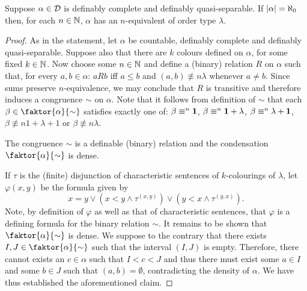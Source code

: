 	\begin{thm}
		Suppose $\alpha\in\mathcal{D}$ is definably complete and definably quasi-separable. If $\left\lvert\alpha\right\rvert=\aleph_0$ then, for each $n\in\mathbb{N}$, $\alpha$ has an $n$-equivalent of order type $\lambda$.
	\end{thm}
	\begin{proof}

		As in the statement, let $\alpha$ be countable, definably complete and definably quasi-separable.  Suppose also that there are $k$ colours defined on $\alpha$, for some fixed $k\in\mathbb{N}$.  Now choose some $n\in\mathbb{N}$ and define a (binary) relation $R$ on $\alpha$ such that, for every $a,b\in\alpha$:  $aRb$ iff $a\leq b$ and $(a,b)\nequiv{n}\lambda$ whenever $a\neq b$.  Since sums preserve $n$-equivalence, we may conclude that $R$ is transitive and therefore induces a congruence $\sim$ on $\alpha$.  Note that it follows from definition of $\sim$ that each $\beta\in\faktor{\alpha}{\sim}$ satisfies exactly one of: $\beta\equiv^{n}\mathbf{1}$, $\beta\equiv^{n}\mathbf{1}+\lambda$, $\beta\equiv^{n}\lambda+\mathbf{1}$, $\beta\nequiv{n}1+\lambda+1$ or $\beta\nequiv{n}\lambda$.

		\begin{claim}
			The congruence $\sim$ is a definable (binary) relation and the condensation $\faktor{\alpha}{\sim}$ is dense.
		\end{claim}
		If $\tau$ is the (finite) disjunction of characteristic sentences of $k$-colourings of $\lambda$, let $\varphi(x,y)$ be the formula given by
		\begin{equation}\label{eq:condef}
			x=y\vee(x<y\wedge\tau^{(x,y)})\vee(y<x\wedge\tau^{(y,x)}).
		\end{equation}
		Note, by definition of $\varphi$ as well as that of characteristic sentences, that $\varphi$ is a defining formula for the binary relation $\sim$.  It remains to be shown that $\faktor{\alpha}{\sim}$ is dense.  We suppose to the contrary that there exists $I,J\in\faktor{\alpha}{\sim}$ such that the interval $(I,J)$ is empty.  Therefore, there cannot exists an $c\in\alpha$ such that $I<c<J$ and thus there must exist some $a\in I$ and some $b\in J$ such that $(a,b)=\emptyset$, contradicting the density of $\alpha$.  We have thus established the aforementioned claim.


\end{proof}
